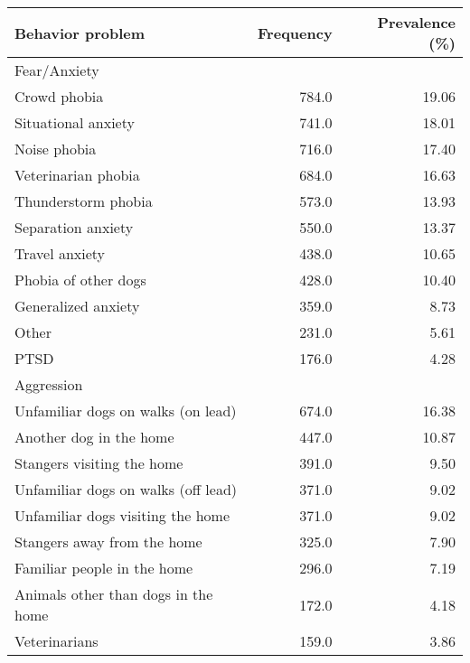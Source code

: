 \documentclass[varwidth=\maxdimen]{standalone}
\newcommand{\subrow}[1]{\hspace{1.25em}#1}
\begin{document}
\begin{tabular}[t]{lrr}
\toprule
Behavior problem &  Frequency &  Prevalence (\%) \\
\midrule
Fear/Anxiety \\
  \subrow{Crowd phobia}                        &      784.0 &           19.06 \\
  \subrow{Situational anxiety}                 &      741.0 &           18.01 \\
  \subrow{Noise phobia}                        &      716.0 &           17.40 \\
  \subrow{Veterinarian phobia}                 &      684.0 &           16.63 \\
  \subrow{Thunderstorm phobia}                 &      573.0 &           13.93 \\
  \subrow{Separation anxiety}                  &      550.0 &           13.37 \\
  \subrow{Travel anxiety}                      &      438.0 &           10.65 \\
  \subrow{Phobia of other dogs}                &      428.0 &           10.40 \\
  \subrow{Generalized anxiety}                 &      359.0 &            8.73 \\
  \subrow{Other}                               &      231.0 &            5.61 \\
  \subrow{PTSD}                                &      176.0 &            4.28 \\
Aggression \\
  \subrow{Unfamiliar dogs on walks (on lead)}  &      674.0 &           16.38 \\
  \subrow{Another dog in the home}             &      447.0 &           10.87 \\
  \subrow{Stangers visiting the home}          &      391.0 &            9.50 \\
  \subrow{Unfamiliar dogs on walks (off lead)} &      371.0 &            9.02 \\
  \subrow{Unfamiliar dogs visiting the home}   &      371.0 &            9.02 \\
  \subrow{Stangers away from the home}         &      325.0 &            7.90 \\
  \subrow{Familiar people in the home}         &      296.0 &            7.19 \\
  \subrow{Animals other than dogs in the home} &      172.0 &            4.18 \\
  \subrow{Veterinarians}                       &      159.0 &            3.86 \\

\end{tabular}
\end{document}
